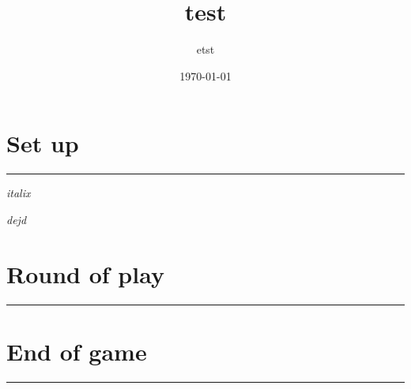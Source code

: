 \documentclass{article}%
\title{test}%
\author{etst}%
\date{\today}%
\begin{document}
%
\normalsize%
\maketitle\thispagestyle{header}%
\pagestyle{header}%
\sectionfont{\color{blue}}%
\subsectionfont{\color{blue}}%
\subsubsectionfont{\color{blue}}%
\section{ Set up
}%
\label{sec:Setup}%
\textcolor{blue}{\rule{18cm}{0.07cm}}\break%
\textit{italix}%

%
\textit{dejd}%



%
\sectionfont{\color{mygreen}}%
\subsectionfont{\color{mygreen}}%
\subsubsectionfont{\color{mygreen}}%
\section{ Round of play
}%
\label{sec:Roundofplay}%
\textcolor{mygreen}{\rule{18cm}{0.07cm}}\break

%
\sectionfont{\color{red}}%
\subsectionfont{\color{red}}%
\subsubsectionfont{\color{red}}%
\section{ End of game}%
\label{sec:Endofgame}%
\textcolor{red}{\rule{18cm}{0.07cm}}\break

%
\end{document}
